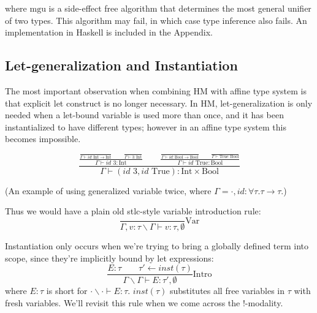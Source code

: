 \documentclass{article}
\newcommand{\inst}[1]{\mathit{inst}(#1)}
\begin{document}
where $\mathrm{mgu}$ is a side-effect free algorithm that determines the most general unifier of two types. This algorithm may fail, in which case type inference also fails. An implementation in Haskell is included in the Appendix.

\subsection{Let-generalization and Instantiation}

The most important observation when combining HM with affine type system is that explicit \textsf{let} construct is no longer necessary. In HM, let-generalization is only needed when a let-bound variable is used more than once, and it has been instantialized to have different types; however in an affine type system this becomes impossible.

\begin{displaymath}
\displaystyle \frac
  { \displaystyle \frac 
      { \displaystyle \frac 
          {} 
          {\Gamma \vdash id : \mathrm{Int} \to \mathrm{Int}} \qquad
        \displaystyle \frac 
          {}
          {\Gamma \vdash \textrm{3} : \mathrm{Int}}
      } 
      {\Gamma \vdash id \textrm{ 3} : \mathrm{Int}} \qquad
    \displaystyle \frac 
      { \displaystyle \frac 
          {} 
          {\Gamma \vdash id : \mathrm{Bool} \to \mathrm{Bool}} \qquad
        \displaystyle \frac 
          {}
          {\Gamma \vdash \textrm{True} : \mathrm{Bool}}
      } 
      {\Gamma \vdash id \textrm{ True} : \mathrm{Bool}}}
  {\Gamma \vdash (id \textrm{ 3}, id \textrm{ True}) : \mathrm{Int} \times \mathrm{Bool}}
\end{displaymath}
\centerline{(An example of using generalized variable twice, where $\Gamma = \cdot, id : \forall \tau. \tau \to \tau$.)}

\bigskip

Thus we would have a plain old stlc-style variable introduction rule:
\begin{displaymath}
  \frac
    {}
    {\Gamma, v : \tau \backslash \Gamma \vdash v : \tau, \emptyset}
  \mathrm{Var}
\end{displaymath}

Instantiation only occurs when we're trying to bring a globally defined term into scope, since they're implicitly bound by let expressions:
\begin{displaymath}
  \frac
    {E : \tau \qquad \tau' \leftarrow \inst{\tau}}
    {\Gamma \backslash \Gamma \vdash E : \tau', \emptyset}
  \mathrm{Intro}
\end{displaymath}
where $E : \tau$ is short for $\cdot \backslash \cdot \vdash E : \tau$. $\inst{\tau}$ substitutes all free variables in $\tau$ with fresh variables. We'll revisit this rule when we come across the !-modality.
\end{document}
